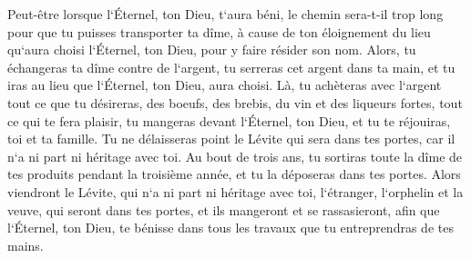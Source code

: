 \verse Peut-être lorsque l`Éternel, ton Dieu, t`aura béni, le chemin sera-t-il trop long pour que tu puisses transporter ta dîme, à cause de ton éloignement du lieu qu`aura choisi l`Éternel, ton Dieu, pour y faire résider son nom. 
\verse Alors, tu échangeras ta dîme contre de l`argent, tu serreras cet argent dans ta main, et tu iras au lieu que l`Éternel, ton Dieu, aura choisi. 
\verse Là, tu achèteras avec l`argent tout ce que tu désireras, des boeufs, des brebis, du vin et des liqueurs fortes, tout ce qui te fera plaisir, tu mangeras devant l`Éternel, ton Dieu, et tu te réjouiras, toi et ta famille. 
\verse Tu ne délaisseras point le Lévite qui sera dans tes portes, car il n`a ni part ni héritage avec toi. 
\verse Au bout de trois ans, tu sortiras toute la dîme de tes produits pendant la troisième année, et tu la déposeras dans tes portes. 
\verse Alors viendront le Lévite, qui n`a ni part ni héritage avec toi, l`étranger, l`orphelin et la veuve, qui seront dans tes portes, et ils mangeront et se rassasieront, afin que l`Éternel, ton Dieu, te bénisse dans tous les travaux que tu entreprendras de tes mains. 

\chapter{}

